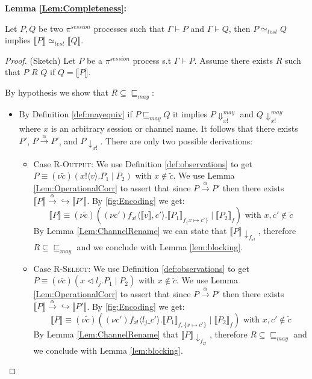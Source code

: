 \textbf{Lemma \ref{Lem:Completeness}:}

Let $P, Q$ be two $\pi^{session}$ processes such that $\Gamma \vdash P$ and $\Gamma \vdash Q$, then $P \simeq_{test} Q$ implies $\llbracket P \rrbracket \simeq_{test} \llbracket Q \rrbracket$.


\begin{proof}
(Sketch) Let $P$ be a $\pi^{session}$ process s.t $\Gamma \vdash P$. Assume there exists $R$ such that $P$ $R$ $Q$ if $Q = \llbracket P \rrbracket$.

By hypothesis we show that $R \subseteq \sqsubseteq_{may}$:

\begin{itemize}
    \item By Definition \ref{def:mayequiv} if $P \sqsubseteq_{may} Q$ it implies $P \Downarrow^{may}_{x!}$ and $Q \Downarrow^{may}_{x!}$ where $x$ is an arbitrary session or channel name. It follows that there exists $P'$, $P \xrightarrow{\alpha} P'$, and $P \downarrow_{x!}$. There are only two possible derivations:
    \begin{itemize}
        \item Case \textsc{R-Output}: We use Definition \autoref{def:observations} to get $P \equiv (\nu \widetilde{c})(x!\langle v \rangle.P_1 \mid P_2)$ with $x \not \in \widetilde{c}$. We use Lemma \ref{Lem:OperationalCorr} to assert that since $P \xrightarrow{\alpha} P'$ then there exists $\llbracket P \rrbracket \xrightarrow{\alpha} \hookrightarrow \llbracket P' \rrbracket$. By \autoref{fig:Encoding} we get:
        \begin{equation*}
            \llbracket P \rrbracket \equiv (\nu \widetilde{c}) ((\nu c')f_{x!}\langle \llbracket v \rrbracket, c' \rangle. \llbracket P_1 \rrbracket_{f_\{x \mapsto c'\}} \mid \llbracket P_2 \rrbracket_f ) \text{ with } x, c' \not \in \widetilde{c}
        \end{equation*}
        By Lemma \ref{Lem:ChannelRename} we can state that $\llbracket P \rrbracket \downarrow_{f_{x!}}$, therefore $R \subseteq \sqsubseteq_{may}$ and we conclude with Lemma \ref{lem:blocking}.
        
        \item Case \textsc{R-Select}: We use Definition \autoref{def:observations} to get $P \equiv (\nu \widetilde{c})(x \vartriangleleft l_j.P_1 \mid P_2)$ with $x \not \in \widetilde{c}$. We use Lemma \ref{Lem:OperationalCorr} to assert that since $P \xrightarrow{\alpha} P'$ then there exists $\llbracket P \rrbracket \xrightarrow{\alpha} \hookrightarrow \llbracket P' \rrbracket$. By \autoref{fig:Encoding} we get:
        \begin{equation*}
            \llbracket P \rrbracket \equiv (\nu \widetilde{c})((\nu c')f_{x!} \langle l_j\_c' \rangle. \llbracket P_1 \rrbracket_{f, \{x \mapsto c' \}} \mid \llbracket P_2 \rrbracket_f ) \text{ with } x, c' \not \in \widetilde{c}
        \end{equation*}
        By Lemma \ref{Lem:ChannelRename} that $\llbracket P \rrbracket \downarrow_{f_{x!}}$, therefore $R \subseteq \sqsubseteq_{may}$ and we conclude with Lemma \ref{lem:blocking}.
    \end{itemize}
\end{itemize}


\end{proof}
